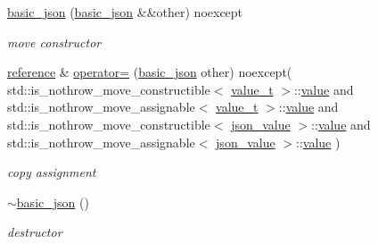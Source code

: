 \begin{DoxyCompactItemize}
\hyperlink{classnlohmann_1_1basic__json_a73e150cbcba5643cb89de8f515eb64e2}{basic\+\_\+json} (\hyperlink{classnlohmann_1_1basic__json}{basic\+\_\+json} \&\&other) noexcept
\begin{DoxyCompactList}\small\item\em move constructor \end{DoxyCompactList}\item 
\hyperlink{classnlohmann_1_1basic__json_a3ec8e17be8732fe436e9d6733f52b7a3}{reference} \& \hyperlink{classnlohmann_1_1basic__json_a7c3182cfabc0bdd9f3a14216fe0e8154}{operator=} (\hyperlink{classnlohmann_1_1basic__json}{basic\+\_\+json} other) noexcept(                       std\+::is\+\_\+nothrow\+\_\+move\+\_\+constructible$<$ \hyperlink{classnlohmann_1_1basic__json_a231b02148577b69a154b2ce2c87a5522}{value\+\_\+t} $>$\+::\hyperlink{classnlohmann_1_1basic__json_a0a2cbbd95862a623e7dc5c37e67dead0}{value} and                       std\+::is\+\_\+nothrow\+\_\+move\+\_\+assignable$<$ \hyperlink{classnlohmann_1_1basic__json_a231b02148577b69a154b2ce2c87a5522}{value\+\_\+t} $>$\+::\hyperlink{classnlohmann_1_1basic__json_a0a2cbbd95862a623e7dc5c37e67dead0}{value} and                       std\+::is\+\_\+nothrow\+\_\+move\+\_\+constructible$<$ \hyperlink{unionnlohmann_1_1basic__json_1_1json__value}{json\+\_\+value} $>$\+::\hyperlink{classnlohmann_1_1basic__json_a0a2cbbd95862a623e7dc5c37e67dead0}{value} and                       std\+::is\+\_\+nothrow\+\_\+move\+\_\+assignable$<$ \hyperlink{unionnlohmann_1_1basic__json_1_1json__value}{json\+\_\+value} $>$\+::\hyperlink{classnlohmann_1_1basic__json_a0a2cbbd95862a623e7dc5c37e67dead0}{value}       )
\begin{DoxyCompactList}\small\item\em copy assignment \end{DoxyCompactList}\item 
\hyperlink{classnlohmann_1_1basic__json_a947b5b2a832e490858dbdddfe7085831}{$\sim$basic\+\_\+json} ()
\begin{DoxyCompactList}\small\item\em destructor \end{DoxyCompactList}\end{DoxyCompactItemize}

